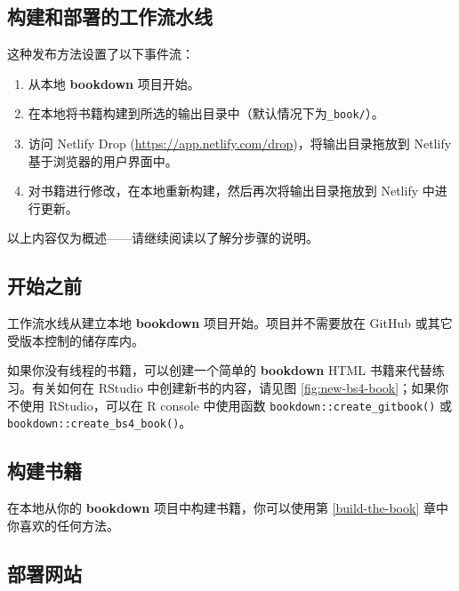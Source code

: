 \documentclass[
  12pt,
]{krantz}
\providecommand{\tightlist}{%
  \setlength{\itemsep}{0pt}\setlength{\parskip}{0pt}}
\theoremstyle{definition}
\theoremstyle{definition}
\theoremstyle{definition}
\theoremstyle{definition}
\theoremstyle{remark}
\begin{document}
\hypertarget{ux6784ux5efaux548cux90e8ux7f72ux7684ux5de5ux4f5cux6d41ux6c34ux7ebf}{%
\subsection{构建和部署的工作流水线}\label{ux6784ux5efaux548cux90e8ux7f72ux7684ux5de5ux4f5cux6d41ux6c34ux7ebf}}

这种发布方法设置了以下事件流：

\begin{enumerate}
\def\labelenumi{\arabic{enumi}.}
\tightlist
\item
  从本地 \textbf{bookdown} 项目开始。
\item
  在本地将书籍构建到所选的输出目录中（默认情况下为\texttt{\_book/}）。
\item
  访问 Netlify Drop (\url{https://app.netlify.com/drop})，将输出目录拖放到 Netlify 基于浏览器的用户界面中。
\item
  对书籍进行修改，在本地重新构建，然后再次将输出目录拖放到 Netlify 中进行更新。
\end{enumerate}

以上内容仅为概述------请继续阅读以了解分步骤的说明。

\hypertarget{ux5f00ux59cbux4e4bux524d}{%
\subsection{开始之前}\label{ux5f00ux59cbux4e4bux524d}}

工作流水线从建立本地 \textbf{bookdown} 项目开始。项目并不需要放在 GitHub 或其它受版本控制的储存库内。

如果你没有线程的书籍，可以创建一个简单的 \textbf{bookdown} HTML 书籍来代替练习。有关如何在 RStudio 中创建新书的内容，请见图 \ref{fig:new-bs4-book}；如果你不使用 RStudio，可以在 R console 中使用函数 \texttt{bookdown::create\_gitbook()} 或 \texttt{bookdown::create\_bs4\_book()}。

\hypertarget{ux6784ux5efaux4e66ux7c4d}{%
\subsection{构建书籍}\label{ux6784ux5efaux4e66ux7c4d}}

在本地从你的 \textbf{bookdown} 项目中构建书籍，你可以使用第 \ref{build-the-book} 章中你喜欢的任何方法。

\hypertarget{ux90e8ux7f72ux7f51ux7ad9}{%
\subsection{部署网站}\label{ux90e8ux7f72ux7f51ux7ad9}}
\end{document}
